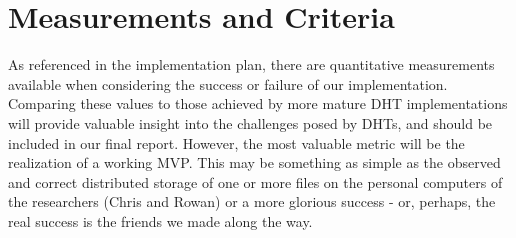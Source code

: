 \documentclass[12pt]{article}
\begin{document}
    \section{Measurements and Criteria}
    As referenced in the implementation plan, there are quantitative
    measurements available when considering the success or failure of our
    implementation.  Comparing these values to those achieved by more mature DHT
    implementations will provide valuable insight into the challenges posed by
    DHTs, and should be included in our final report.  However, the most
    valuable metric will be the realization of a working MVP.  This may be
    something as simple as the observed and correct distributed storage of one or more files on the
    personal computers of the researchers (Chris and Rowan) or a more glorious
    success - or, perhaps, the real success is the friends we made along the
    way.

%   
    
\end{document}
